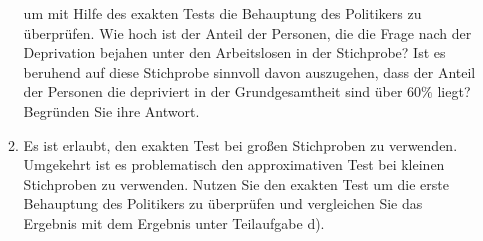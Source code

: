 \documentclass[11pt]{article}
\begin{document}
\begin{enumerate}
\begin{enumerate}
{um mit Hilfe des exakten Tests die Behauptung des Politikers zu überprüfen. Wie hoch ist der Anteil der
Personen, die die Frage nach der Deprivation bejahen unter den Arbeitslosen in der Stichprobe? Ist es beruhend
auf diese Stichprobe sinnvoll davon auszugehen, dass der Anteil der Personen die depriviert
in der Grundgesamtheit sind über $60\%$ liegt? Begründen Sie ihre Antwort.}
\item{Es ist erlaubt, den exakten Test bei großen Stichproben zu verwenden. Umgekehrt ist es problematisch
den approximativen Test bei kleinen Stichproben zu verwenden. Nutzen Sie den exakten Test um die erste
Behauptung des Politikers zu überprüfen und vergleichen Sie das Ergebnis mit dem Ergebnis unter Teilaufgabe d).}
\end{enumerate}



\end{enumerate}
\end{document}
